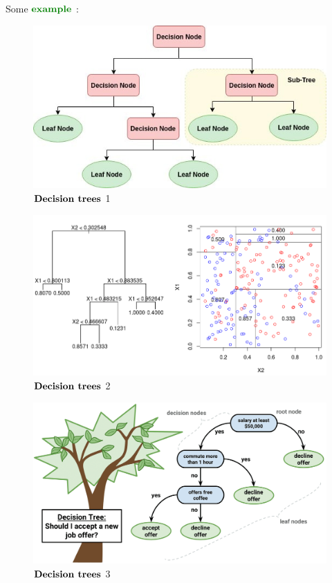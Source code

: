 Some $\example$:
\begin{figure}[H]
    \centering
    \includegraphics[scale = 0.5]{Question6/DT.jpg}
    \caption{$\textbf{Decision trees}$ 1}
    \label{fig:my_label}
\end{figure}
\begin{figure}[H]
    \centering
    \includegraphics[scale = 0.5]{Question6/DT1.png}
    \caption{$\textbf{Decision trees}$ 2}
    \label{fig:my_label}
\end{figure}
\begin{figure}[H]
    \centering
    \includegraphics[scale = 0.2]{Question6/DT2.png}
    \caption{$\textbf{Decision trees}$ 3}
    \label{fig:my_label}
\end{figure}
